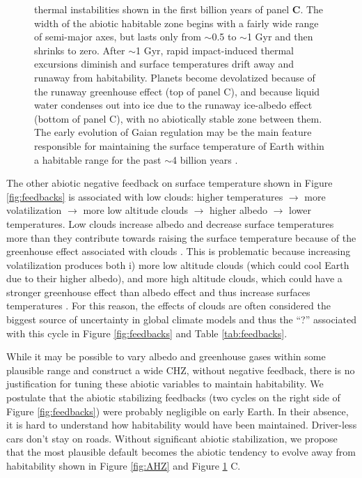 \begin{figure}[!htbp]
{thermal instabilities shown in the first billion years of panel \textbf{C}.
The width of the abiotic habitable zone begins with a fairly wide range of semi-major axes, but lasts only from $\sim$0.5 to $\sim$1 Gyr
and then shrinks to zero.
After $\sim$1 Gyr, rapid impact-induced thermal excursions diminish and surface temperatures drift away and runaway from habitability.
Planets become devolatized because of the runaway greenhouse effect (top of panel C), 
and because liquid water condenses out into ice due to the runaway ice-albedo effect (bottom of panel C), with no abiotically stable zone between them.
The early evolution of Gaian regulation may be the main feature responsible for maintaining the surface temperature of Earth within a habitable range for the past $\sim$4 billion years \citep{Lovelock2000}.
	}
	\label{fig:GaianHZ}
\end{figure}

The other abiotic negative feedback on surface temperature shown in Figure \ref{fig:feedbacks} is associated with low clouds:
higher temperatures  $\rightarrow$ more volatilization $\rightarrow$ more low altitude clouds  $\rightarrow$ higher albedo  $\rightarrow$ lower temperatures. Low clouds increase albedo and decrease surface temperatures more than they contribute towards raising the surface temperature because of the greenhouse effect associated with clouds \citep{Abe2011}. This is problematic because increasing volatilization produces both i) more low altitude clouds (which could cool Earth due to their higher albedo), and more high altitude clouds, which could have a stronger greenhouse effect than albedo effect and thus increase surfaces temperatures \citep{Goldblatt2011,Leconte2013}. For this reason, the effects of clouds are often considered the biggest source of uncertainty in global climate models and thus the ``?'' associated with this cycle in Figure \ref{fig:feedbacks} and Table \ref{tab:feedbacks}.

While it may be possible to vary albedo and greenhouse gases within some plausible range and construct a wide CHZ, without negative feedback, there is no justification for tuning these abiotic variables to maintain habitability. We postulate that the abiotic stabilizing feedbacks (two cycles on the right side of Figure \ref{fig:feedbacks}) were probably negligible
on early Earth. In their absence, it is hard to understand how habitability would have been maintained. Driver-less cars don't stay on roads. Without significant abiotic stabilization, we propose that the most plausible default becomes the abiotic tendency to evolve away from habitability shown in Figure \ref{fig:AHZ}
and Figure \ref{fig:GaianHZ} C.

